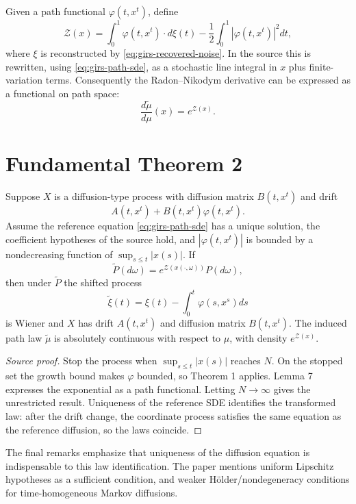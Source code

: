 Given a path functional \(\varphi(t,x^t)\), define
\begin{equation}\label{eq:girs-Zpath}
 \mathcal Z(x)=
 \int_0^1\varphi(t,x^t)\cdot d\xi(t)
 -\frac12\int_0^1|\varphi(t,x^t)|^2dt,
\end{equation}
where \(\xi\) is reconstructed by \eqref{eq:girs-recovered-noise}.  In the source this is rewritten,
using \eqref{eq:girs-path-sde}, as a stochastic line integral in \(x\) plus finite-variation terms.
Consequently the Radon--Nikodym derivative can be expressed as a functional on path space:
\[
 \frac{d\widetilde\mu}{d\mu}(x)=e^{\mathcal Z(x)}.
\]

\section{Fundamental Theorem 2}
\begin{theorem}
Suppose \(X\) is a diffusion-type process with diffusion matrix \(B(t,x^t)\) and drift
\[
 A(t,x^t)+B(t,x^t)\varphi(t,x^t).
\]
Assume the reference equation \eqref{eq:girs-path-sde} has a unique solution, the coefficient
hypotheses of the source hold, and \(|\varphi(t,x^t)|\) is bounded by a nondecreasing function of
\(\sup_{s\le t}|x(s)|\).  If
\[
 \widetilde P(d\omega)=e^{\mathcal Z(x(\cdot,\omega))}P(d\omega),
\]
then under \(\widetilde P\) the shifted process
\[
 \widetilde\xi(t)=\xi(t)-\int_0^t\varphi(s,x^s)ds
\]
is Wiener and \(X\) has drift \(A(t,x^t)\) and diffusion matrix \(B(t,x^t)\).  The induced path law
\(\widetilde\mu\) is absolutely continuous with respect to \(\mu\), with density
\(e^{\mathcal Z(x)}\).
\end{theorem}

\begin{proof}[Source proof]
Stop the process when \(\sup_{s\le t}|x(s)|\) reaches \(N\).  On the stopped set the growth bound
makes \(\varphi\) bounded, so Theorem 1 applies.  Lemma 7 expresses the exponential as a path
functional.  Letting \(N\to\infty\) gives the unrestricted result.  Uniqueness of the reference SDE
identifies the transformed law: after the drift change, the coordinate process satisfies the same
equation as the reference diffusion, so the laws coincide.
\end{proof}

The final remarks emphasize that uniqueness of the diffusion equation is indispensable to this law
identification.  The paper mentions uniform Lipschitz hypotheses as a sufficient condition, and
weaker H\"older/nondegeneracy conditions for time-homogeneous Markov diffusions.

